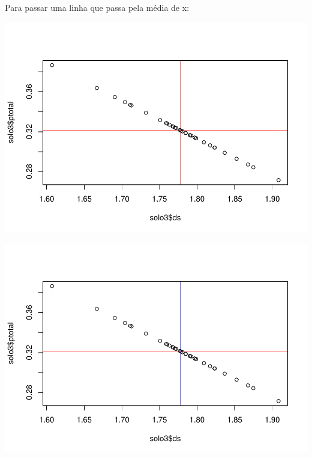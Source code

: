 \documentclass[
]{book}
\newenvironment{Shaded}{\begin{snugshade}}{\end{snugshade}}
\newcommand{\CommentTok}[1]{\textcolor[rgb]{0.56,0.35,0.01}{\textit{#1}}}
\newcommand{\DataTypeTok}[1]{\textcolor[rgb]{0.13,0.29,0.53}{#1}}
\newcommand{\KeywordTok}[1]{\textcolor[rgb]{0.13,0.29,0.53}{\textbf{#1}}}
\newcommand{\NormalTok}[1]{#1}
\newcommand{\OperatorTok}[1]{\textcolor[rgb]{0.81,0.36,0.00}{\textbf{#1}}}
\begin{document}
Para passar uma linha que passa pela média de x:

\begin{Shaded}
\end{Shaded}

\includegraphics{TudodoR_files/figure-latex/unnamed-chunk-163-1.pdf}

\begin{Shaded}
\end{Shaded}

\includegraphics{TudodoR_files/figure-latex/unnamed-chunk-164-1.pdf}
\end{document}
